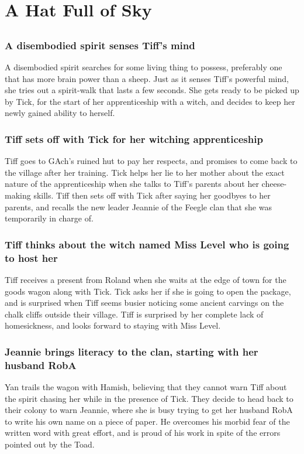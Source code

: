 \section{A Hat Full of Sky}


\subsection{}
\subsubsection{A disembodied spirit senses \Gls{Tiff}'s mind}
A disembodied spirit searches for some living thing to possess, preferably one that has more
brain power than a sheep. Just as it senses \Gls{Tiff}'s powerful mind, she tries out a spirit-walk
that lasts a few seconds. She gets ready to be picked up by \Gls{Tick}, for the start of her
apprenticeship with a witch, and decides to keep her newly gained ability to herself.

\subsubsection{\Gls{Tiff} sets off with \Gls{Tick} for her witching apprenticeship}
\Gls{Tiff} goes to \Gls{GAch}'s ruined hut to pay her respects, and promises to come back to the
village after her training. \Gls{Tick} helps her lie to her mother about the exact nature of the
apprenticeship when she talks to \Gls{Tiff}'s parents about her cheese-making skills. \Gls{Tiff}
then sets off with \Gls{Tick} after saying her goodbyes to her parents, and recalls the new
leader \Gls{Jeannie} of the Feegle clan that she was temporarily in charge of.

\subsubsection{\Gls{Tiff} thinks about the witch named Miss \Gls{Level} who is going to host her}
\Gls{Tiff} receives a present from \Gls{Roland} when she waits at the edge of town for the goods
wagon along with \Gls{Tick}. \Gls{Tick} asks her if she is going to open the package, and is
surprised when \Gls{Tiff} seems busier noticing some ancient carvings on the chalk cliffs outside
their village. \Gls{Tiff} is surprised by her complete lack of homesickness, and looks forward
to staying with Miss \Gls{Level}.

\subsubsection{\Gls{Jeannie} brings literacy to the clan, starting with her husband \Gls{RobA}}
\Gls{Yan} trails the wagon with \Gls{Hamish}, believing that they cannot warn \Gls{Tiff} about the
spirit chasing her while in the presence of \Gls{Tick}. They decide to head back to their colony to
warn \Gls{Jeannie}, where she is busy trying to get her husband \Gls{RobA} to write his own name
on a piece of paper. He overcomes his morbid fear of the written word with great effort, and is
proud of his work in spite of the errors pointed out by the \Gls{Toad}.

